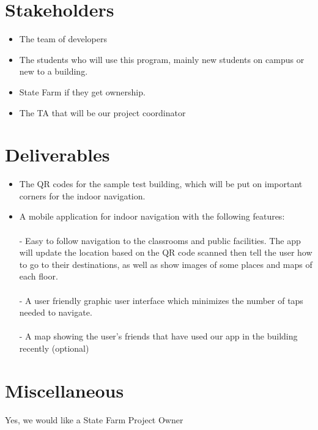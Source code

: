\documentclass{article}
\begin{document}
\section{Stakeholders}

\begin{itemize}
\item The team of developers
\item The students who will use this program, mainly new students on campus or new to a building.
\item State Farm if they get ownership.
\item The TA that will be our project coordinator
\end{itemize}

\section{Deliverables}



\begin{itemize}

\item The QR codes for the sample test building, which will be put on important corners for the indoor navigation.
\item A mobile application for indoor navigation with the following features: \\ \\
  -  Easy to follow navigation to the classrooms and public facilities. The app will update the location based on the QR code scanned then tell the user how to go to their destinations, as well as show images of some places and maps of each floor. \\ \\
  -  A user friendly graphic user interface which minimizes the number of taps needed to navigate. \\ \\
  -  A map showing the user’s friends that have used our app in the building recently (optional)
\end{itemize}



\section{Miscellaneous}

Yes, we would like a State Farm Project Owner
\end{document}
